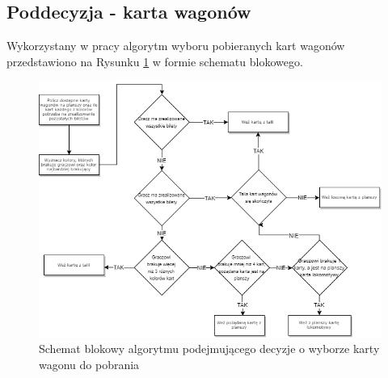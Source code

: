 \documentclass[12pt, oneside]{report}
\begin{document}
	\subsection{Poddecyzja - karta wagonów}
	Wykorzystany w pracy algorytm wyboru pobieranych kart wagonów przedstawiono na Rysunku \ref{figure:wagons_diagram} w formie schematu blokowego.
	\begin{figure}[h]
		\centering
		\includegraphics[height=0.6\textheight]{Wagon_card.png}
		\caption{Schemat blokowy algorytmu podejmującego decyzje o wyborze karty wagonu do pobrania}
		\label{figure:wagons_diagram}
	\end{figure}
	
\end{document}
